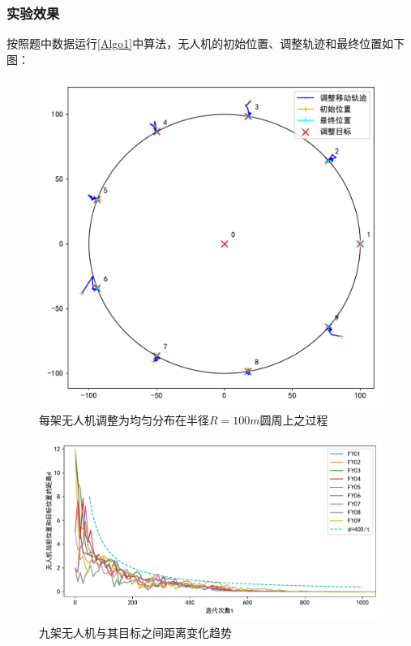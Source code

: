 \documentclass[withoutpreface,bwprint]{cumcmthesis} %
\begin{document}
\subsubsection{实验效果}
按照题中数据运行\ref{Algo1}中算法，无人机的初始位置、调整轨迹和最终位置如下图\cite{辛沙欧2021基于纯方位的多无人机协同目标跟踪算法}：
\begin{figure}[H]
    \centering
    \includegraphics[width=0.7\linewidth]{figures/Circle9_0.pdf}
    \caption{每架无人机调整为均匀分布在半径$R=100m$圆周上之过程}
    \label{fig:Circle9_0}
\end{figure}
\begin{figure}[H]
    \centering
    \includegraphics[width=0.9\linewidth]{figures/c9_convergence.pdf}
    \caption{九架无人机与其目标之间距离变化趋势}
    \label{fig:Circle9_Convergence}
\end{figure}
\end{document}
